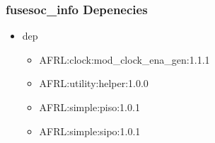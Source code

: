 \subsubsection{fusesoc\_info Depenecies}
\begin{itemize}
\item dep
	\begin{itemize}
	\item AFRL:clock:mod\_clock\_ena\_gen:1.1.1
	\item AFRL:utility:helper:1.0.0
	\item AFRL:simple:piso:1.0.1
	\item AFRL:simple:sipo:1.0.1
	\end{itemize}
\end{itemize}
